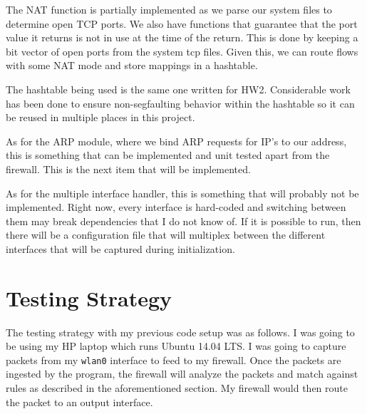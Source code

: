 \documentclass[12pt]{article}
\begin{document}
The NAT function is partially implemented as we parse our system files to 
determine open TCP ports. We also have functions that guarantee that the port
value it returns is not in use at the time of the return. This is done by 
keeping a bit vector of open ports from the system tcp files. Given this,
we can route flows with some NAT mode and store mappings in a hashtable. \par
The hashtable being used is the same one written for HW2. Considerable work
has been done to ensure non-segfaulting behavior within the hashtable so it
can be reused in multiple places in this project. \par
As for the ARP module, where we bind ARP requests for IP's to our address,
this is something that can be implemented and unit tested apart from the firewall.
This is the next item that will be implemented. \par
As for the multiple interface handler, this is something that will probably 
not be implemented. Right now, every interface is hard-coded and switching between
them may break dependencies that I do not know of. If it is possible to run,
then there will be a configuration file that will multiplex between the different
interfaces that will be captured during initialization. 

\section{Testing Strategy}

The testing strategy with my previous code setup was as follows. 
I was going to be using my HP laptop which runs Ubuntu 14.04 LTS.
I was going to capture packets from my \texttt{wlan0} interface to feed to my firewall.
Once the packets are ingested by the program,
the firewall will analyze the packets and match against rules
as described in the aforementioned section.
My firewall would then route the packet to an output interface. \par
\end{document}
